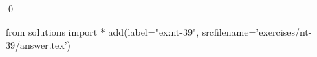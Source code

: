 
\begin{ex} 
  \label{ex:nt-39}
  
  \qed
\end{ex} 
\begin{python0}
from solutions import *
add(label="ex:nt-39",
    srcfilename='exercises/nt-39/answer.tex') 
\end{python0}
